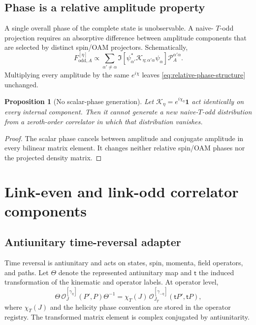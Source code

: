 \documentclass[11pt]{article}
\newtheorem{proposition}[definition]{Proposition}
\newcommand{\cO}{\mathcal O}
\newcommand{\cK}{\mathcal K}
\newcommand{\cP}{\mathcal P}
\newcommand{\bbone}{\bm 1}
\newcommand{\odd}{\mathrm{odd}}
\begin{document}
\subsection{Phase is a relative amplitude property}

A single overall phase of the complete state is unobservable.  A naive-
\(T\)-odd projection requires an absorptive difference between amplitude
components that are selected by distinct spin/OAM projectors.  Schematically,
\begin{equation}
 F_{\odd,A}^{[\eta]}
 \propto
 \sum_{\alpha'\neq\alpha}
 \Im\!\left[
 \psi_{\alpha'}^*
 \cK_{\eta;\alpha'\alpha}
 \psi_\alpha
 \right]\cP_A^{\alpha'\alpha}.
\label{eq:relative-phase-structure}
\end{equation}
Multiplying every amplitude by the same \(e^{i\chi}\) leaves
\cref{eq:relative-phase-structure} unchanged.

\begin{proposition}[No scalar-phase generation]
\label{prop:no-scalar-phase}
Let \(\cK_\eta=e^{i\chi_\eta}\bbone\) act identically on every internal
component.  Then it cannot generate a new naive-\(T\)-odd distribution from a
zeroth-order correlator in which that distribution vanishes.
\end{proposition}

\begin{proof}
The scalar phase cancels between amplitude and conjugate amplitude in every
bilinear matrix element.  It changes neither relative spin/OAM phases nor the
projected density matrix.
\end{proof}

\section{Link-even and link-odd correlator components}
\label{sec:link-parity}

\subsection{Antiunitary time-reversal adapter}

Time reversal is antiunitary and acts on states, spin, momenta, field
operators, and paths.  Let \(\Theta\) denote the represented antiunitary map
and \(\mathsf t\) the induced transformation of the kinematic and operator
labels.  At operator level,
\begin{equation}
 \Theta\,
 \cO_{J}^{[\gamma_\eta]}(P',P)
 \Theta^{-1}
 =\chi_T(J)\,
 \cO_{J_T}^{[\gamma_{-\eta}]}
 (\mathsf tP',\mathsf tP),
\label{eq:time-reversal-operator}
\end{equation}
where \(\chi_T(J)\) and the helicity phase convention are stored in the
operator registry.  The transformed matrix element is complex conjugated by
antiunitarity.
\end{document}
